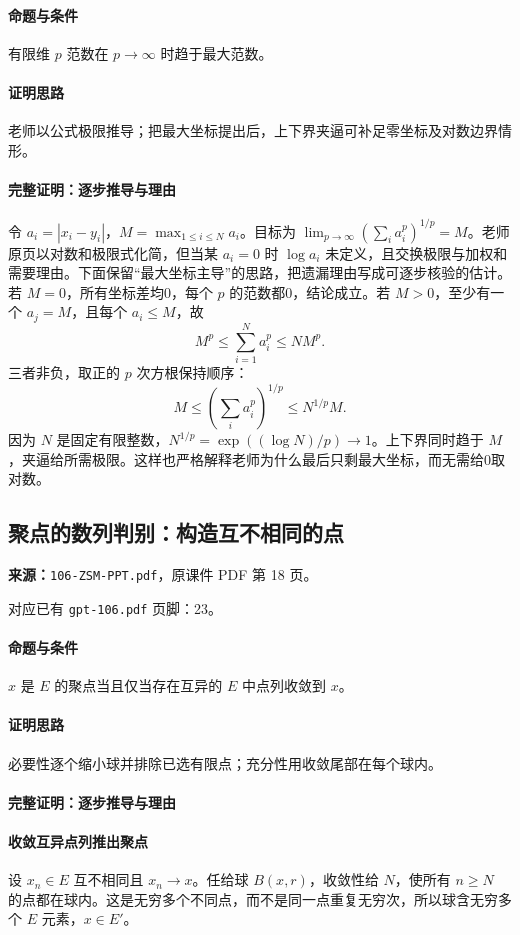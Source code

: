\paragraph{命题与条件}有限维 $p$ 范数在 $p\to\infty$ 时趋于最大范数。
\paragraph{证明思路}老师以公式极限推导；把最大坐标提出后，上下界夹逼可补足零坐标及对数边界情形。
\paragraph{完整证明：逐步推导与理由}

令 $a_i=|x_i-y_i|$，$M=\max_{1\le i\le N}a_i$。目标为 $\lim_{p\to\infty}(\sum_i a_i^p)^{1/p}=M$。老师原页以对数和极限式化简，但当某 $a_i=0$ 时 $\log a_i$ 未定义，且交换极限与加权和需要理由。下面保留“最大坐标主导”的思路，把遗漏理由写成可逐步核验的估计。
若 $M=0$，所有坐标差均0，每个 $p$ 的范数都0，结论成立。若 $M>0$，至少有一个 $a_j=M$，且每个 $a_i\le M$，故
\[M^p\le\sum_{i=1}^N a_i^p\le NM^p.\]
三者非负，取正的 $p$ 次方根保持顺序：
\[M\le\left(\sum_i a_i^p\right)^{1/p}\le N^{1/p}M.\]
因为 $N$ 是固定有限整数，$N^{1/p}=\exp((\log N)/p)\to1$。上下界同时趋于 $M$，夹逼给所需极限。这样也严格解释老师为什么最后只剩最大坐标，而无需给0取对数。

\clearpage\subsection{聚点的数列判别：构造互不相同的点}
\textbf{来源：}\texttt{106-ZSM-PPT.pdf}，原课件 PDF 第 18 页。\par
对应已有 \texttt{gpt-106.pdf} 页脚：23。\par
\paragraph{命题与条件}$x$ 是 $E$ 的聚点当且仅当存在互异的 $E$ 中点列收敛到 $x$。
\paragraph{证明思路}必要性逐个缩小球并排除已选有限点；充分性用收敛尾部在每个球内。
\paragraph{完整证明：逐步推导与理由}

\paragraph{收敛互异点列推出聚点}设 $x_n\in E$ 互不相同且 $x_n\to x$。任给球 $B(x,r)$，收敛性给 $N$，使所有 $n\ge N$ 的点都在球内。这是无穷多个不同点，而不是同一点重复无穷次，所以球含无穷多个 $E$ 元素，$x\in E'$。
